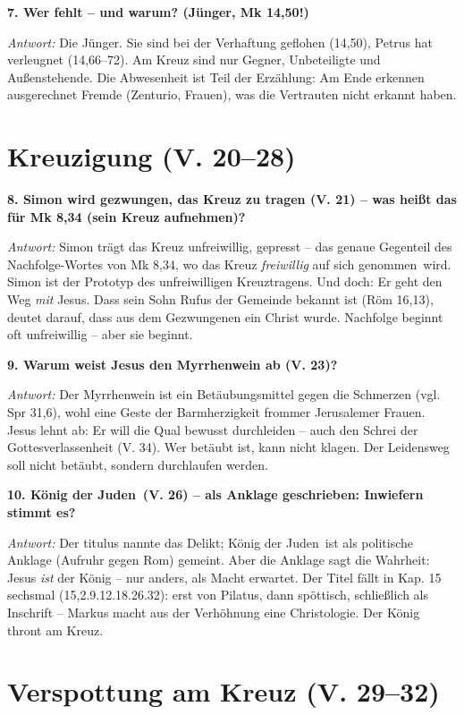 \documentclass[12pt,a4paper]{article}
\newcommand{\frage}[1]{\par\vspace{0.7em}\noindent\textbf{#1}\par}
\newcommand{\antwort}[1]{\par\noindent\textit{Antwort:} #1\par}
\begin{document}
\frage{7. Wer fehlt -- und warum? (Jünger, Mk 14,50!)}
\antwort{Die Jünger. Sie sind bei der Verhaftung geflohen (14,50), Petrus hat verleugnet (14,66--72). Am Kreuz sind nur Gegner, Unbeteiligte und Außenstehende. Die Abwesenheit ist Teil der Erzählung: Am Ende erkennen ausgerechnet Fremde (Zenturio, Frauen), was die Vertrauten nicht erkannt haben.}

\section*{Kreuzigung (V. 20--28)}

\frage{8. Simon wird \textbf{gezwungen}, das Kreuz zu tragen (V. 21) -- was heißt das für Mk 8,34 (\glqq sein Kreuz aufnehmen\grqq{})?}
\antwort{Simon trägt das Kreuz unfreiwillig, gepresst -- das genaue Gegenteil des Nachfolge-Wortes von Mk 8,34, wo das Kreuz \emph{freiwillig} \glqq auf sich genommen\grqq\ wird. Simon ist der Prototyp des unfreiwilligen Kreuztragens. Und doch: Er geht den Weg \emph{mit} Jesus. Dass sein Sohn Rufus der Gemeinde bekannt ist (Röm 16,13), deutet darauf, dass aus dem Gezwungenen ein Christ wurde. Nachfolge beginnt oft unfreiwillig -- aber sie beginnt.}

\frage{9. Warum weist Jesus den Myrrhenwein ab (V. 23)?}
\antwort{Der Myrrhenwein ist ein Betäubungsmittel gegen die Schmerzen (vgl. Spr 31,6), wohl eine Geste der Barmherzigkeit frommer Jerusalemer Frauen. Jesus lehnt ab: Er will die Qual bewusst durchleiden -- auch den Schrei der Gottesverlassenheit (V. 34). Wer betäubt ist, kann nicht klagen. Der Leidensweg soll nicht betäubt, sondern durchlaufen werden.}

\frage{10. \glqq König der Juden\grqq\ (V. 26) -- als Anklage geschrieben: Inwiefern stimmt es?}
\antwort{Der titulus nannte das Delikt; \glqq König der Juden\grqq\ ist als politische Anklage (Aufruhr gegen Rom) gemeint. Aber die Anklage sagt die Wahrheit: Jesus \emph{ist} der König -- nur anders, als Macht erwartet. Der Titel fällt in Kap. 15 sechsmal (15,2.9.12.18.26.32): erst von Pilatus, dann spöttisch, schließlich als Inschrift -- Markus macht aus der Verhöhnung eine Christologie. Der König thront am Kreuz.}

\section*{Verspottung am Kreuz (V. 29--32)}
\end{document}
